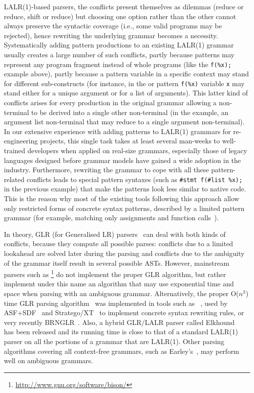 LALR(1)\hyp{}based parsers, the conflicts present themselves as
dilemmas (reduce or reduce, shift or reduce) but choosing one option
rather than the other cannot always preserve the syntactic coverage
(i.e., some valid programs may be rejected), hence rewriting the
underlying grammar becomes a necessity. Systematically adding pattern
productions to an existing LALR(1) grammar usually creates a large
number of such conflicts, partly because patterns may represent any
program fragment instead of whole programs (like the \texttt{f(\%x);}
example above), partly because a pattern variable in a specific
context may stand for different sub\hyp{}constructs (for instance, in
the \Clang or \Java pattern \texttt{f(\%x)} variable \texttt{x} may
stand either for a unique argument or for a list of arguments). This
latter kind of conflicts arises for every production in the original
grammar allowing a non\hyp{}terminal to be derived into a single other
non\hyp{}terminal (in the example, an argument list non\hyp{}terminal
that may reduce to a single argument non\hyp{}terminal). In our
extensive experience with adding patterns to LALR(1) grammars for
re\hyp{}engineering projects, this single task takes at least several
man\hyp{}weeks to well\hyp{}trained developers when applied on
real\hyp{}size grammars, especially those of legacy languages designed
before grammar models have gained a wide adoption in the
industry. Furthermore, rewriting the grammar to cope with all these
pattern\hyp{}related conflicts leads to special pattern syntaxes (such
as \texttt{\#stmt f(\#list \%x);} in the previous example) that make
the patterns look less similar to native code. This is the reason why
most of the existing tools following this approach allow only
restricted forms of concrete syntax patterns, described by a limited
pattern grammar (for example, matching only assignments and function
calls~\cite{blast-ql}).

In theory, GLR (for Generalised LR) parsers~\cite{glr} can deal with
both kinds of conflicts, because they compute all possible parses:
conflicts due to a limited lookahead are solved later during the
parsing and conflicts due to the ambiguity of the grammar itself
result in several possible ASTs. However, mainstream parsers such as
\Bison\footnote{\url{http://www.gnu.org/software/bison/}} do not
implement the proper GLR algorithm, but rather implement under this
name an algorithm that may use exponential time and space when parsing
with an ambiguous grammar. Alternatively, the proper O($n^3$) time GLR
parsing algorithm~\cite{glr} was implemented in tools such as
\SDF~\cite{sdf}, used by \textsf{ASF+SDF}~\cite{asf+sdf} and
\textsf{Stratego/XT}~\cite{metaprog} to implement concrete syntax
rewriting rules, or very recently BRNGLR~\cite{brnglr}. Also, a hybrid
GLR/LALR parser called \textsf{Elkhound}~\cite{elkhound} has been
released and its running time is close to that of a standard LALR(1)
parser on all the portions of a grammar that are LALR(1). Other
parsing algorithms covering all context\hyp{}free grammars, such as
Earley's~\cite{earley}, may perform well on ambiguous grammars.

